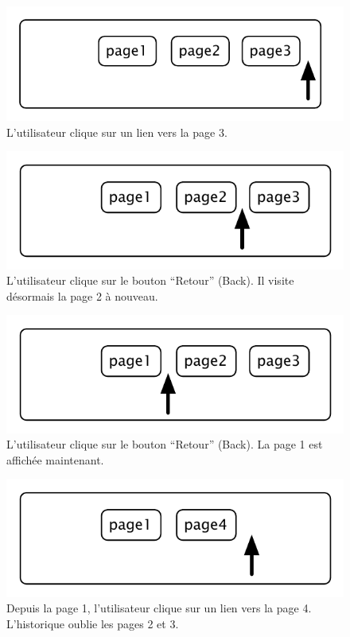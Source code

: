 \documentclass[a4paper,10pt,twoside]{book}
\begin{document}
\begin{figure}[!ht]
\centerline{\includegraphics[scale=0.5]{page3Stef}}
\caption{L'utilisateur clique sur un lien vers la page 3.}
\vspace{.2in}
\end{figure}

\begin{figure}[!ht]
\centerline{\includegraphics[scale=0.5]{page2_Stef}}
\caption{L'utilisateur clique sur le bouton ``Retour'' (Back). Il visite désormais la page 2 à nouveau.}
\vspace{.2in}
\end{figure}

\begin{figure}[!ht]
\centerline{\includegraphics[scale=0.5]{page1_Stef}}
\caption{L'utilisateur clique sur le bouton ``Retour'' (Back). La page 1 est affichée maintenant.}
\vspace{.2in}
\end{figure}

\begin{figure}[!ht]
\centerline{\includegraphics[scale=0.5]{page4Stef}}
\caption{Depuis la page 1, l'utilisateur clique sur un lien vers la page 4. L'historique oublie les pages 2 et 3.}
\vspace{.2in}
\end{figure}
\end{document}
